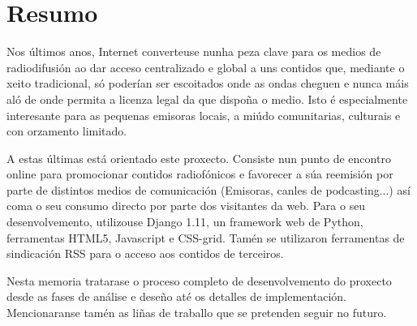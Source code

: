 \thispagestyle{plain}
\section*{Resumo}

Nos últimos anos, Internet converteuse nunha peza clave para os medios de radiodifusión ao dar acceso centralizado e global a uns contidos que, mediante o xeito tradicional, só poderían ser escoitados onde as ondas cheguen e nunca máis aló de onde permita a licenza legal da que dispoña o medio. Isto é especialmente interesante para as pequenas emisoras locais, a miúdo comunitarias, culturais e con orzamento limitado.

A estas últimas está orientado este proxecto. Consiste nun punto de encontro online para promocionar contidos radiofónicos e favorecer a súa reemisión por parte de distintos medios de comunicación (Emisoras, canles de podcasting...) así coma o seu consumo directo por parte dos visitantes da web. Para o seu desenvolvemento, utilizouse Django 1.11, un framework web de Python, ferramentas HTML5, Javascript e CSS-grid. Tamén se utilizaron ferramentas de sindicación RSS para o acceso aos contidos de terceiros.

Nesta memoria tratarase o proceso completo de desenvolvemento do proxecto desde as fases de análise e deseño até os detalles de implementación. Mencionaranse tamén as liñas de traballo que se pretenden seguir no futuro.

   
